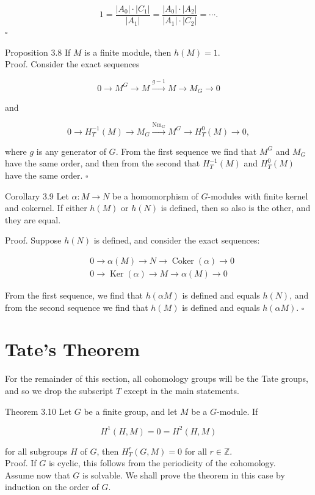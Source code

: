 \documentclass[10pt]{article}
\begin{document}
$$
1=\frac{\left|A_{0}\right| \cdot\left|C_{1}\right|}{\left|A_{1}\right|}=\frac{\left|A_{0}\right| \cdot\left|A_{2}\right|}{\left|A_{1}\right| \cdot\left|C_{2}\right|}=\cdots .
$$ \(\square\)

Proposition 3.8 If $M$ is a finite module, then $h(M)=1$.\\
Proof. Consider the exact sequences

$$
0 \rightarrow M^{G} \rightarrow M \xrightarrow{g-1} M \rightarrow M_{G} \rightarrow 0
$$

and

$$
0 \rightarrow H_{T}^{-1}(M) \rightarrow M_{G} \xrightarrow{\mathrm{Nm}_{G}} M^{G} \rightarrow H_{T}^{0}(M) \rightarrow 0,
$$

where $g$ is any generator of $G$. From the first sequence we find that $M^{G}$ and $M_{G}$ have the same order, and then from the second that $H_{T}^{-1}(M)$ and $H_{T}^{0}(M)$ have the same order. \(\square\)

Corollary 3.9 Let $\alpha: M \rightarrow N$ be a homomorphism of $G$-modules with finite kernel and cokernel. If either $h(M)$ or $h(N)$ is defined, then so also is the other, and they are equal.

Proof. Suppose $h(N)$ is defined, and consider the exact sequences:

$$
\begin{aligned}
& 0 \rightarrow \alpha(M) \rightarrow N \rightarrow \operatorname{Coker}(\alpha) \rightarrow 0 \\
& 0 \rightarrow \operatorname{Ker}(\alpha) \rightarrow M \rightarrow \alpha(M) \rightarrow 0
\end{aligned}
$$

From the first sequence, we find that $h(\alpha M)$ is defined and equals $h(N)$, and from the second sequence we find that $h(M)$ is defined and equals $h(\alpha M)$. \(\square\)

\section*{Tate's Theorem}
For the remainder of this section, all cohomology groups will be the Tate groups, and so we drop the subscript $T$ except in the main statements.

Theorem 3.10 Let $G$ be a finite group, and let $M$ be a $G$-module. If

$$
H^{1}(H, M)=0=H^{2}(H, M)
$$

for all subgroups $H$ of $G$, then $H_{T}^{r}(G, M)=0$ for all $r \in \mathbb{Z}$.\\
Proof. If $G$ is cyclic, this follows from the periodicity of the cohomology.\\
Assume now that $G$ is solvable. We shall prove the theorem in this case by induction on the order of $G$.
\end{document}
